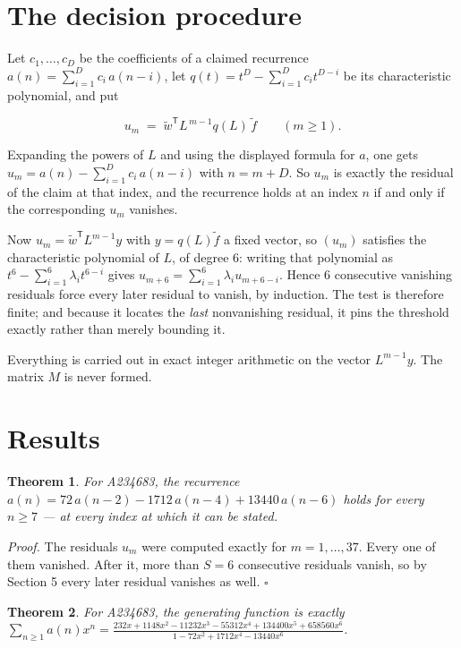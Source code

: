 \documentclass[11pt]{article}
\newtheorem{theorem}{Theorem}
\theoremstyle{definition}
\begin{document}
\section{The decision procedure}

Let $c_1,\dots,c_D$ be the coefficients of a claimed recurrence $a(n) = \sum_{i=1}^{D} c_i\,a(n-i)$, let $q(t) = t^{D} - \sum_{i=1}^{D} c_i t^{D-i}$ be its characteristic polynomial, and put

\[u_m \;=\; \tilde w^{\mathsf T} L^{\,m-1} q(L)\,\tilde f \qquad (m \ge 1).\]

Expanding the powers of $L$ and using the displayed formula for $a$, one gets $u_m = a(n) - \sum_{i=1}^{D} c_i\,a(n-i)$ with $n = m + D$. So $u_m$ is exactly the residual of the claim at that index, and the recurrence holds at an index $n$ if and only if the corresponding $u_m$ vanishes.

Now $u_m = \tilde w^{\mathsf T} L^{m-1} y$ with $y = q(L)\tilde f$ a fixed vector, so $(u_m)$ satisfies the characteristic polynomial of $L$, of degree $6$: writing that polynomial as $t^{6} - \sum_{i=1}^{6} \lambda_i t^{6-i}$ gives $u_{m+6} = \sum_{i=1}^{6} \lambda_i u_{m+6-i}$. Hence $6$ consecutive vanishing residuals force every later residual to vanish, by induction. The test is therefore finite; and because it locates the {\itshape last} nonvanishing residual, it pins the threshold exactly rather than merely bounding it.

Everything is carried out in exact integer arithmetic on the vector $L^{m-1}y$. The matrix $M$ is never formed.

\section{Results}

\begin{theorem} For A234683, the recurrence $a(n) = 72\,a(n-2) - 1712\,a(n-4) + 13440\,a(n-6)$ holds for every $n \ge 7$ --- at every index at which it can be stated.\end{theorem}

{\itshape Proof.} The residuals $u_m$ were computed exactly for $m = 1,\dots,37$. Every one of them vanished. After it, more than $S = 6$ consecutive residuals vanish, so by Section 5 every later residual vanishes as well. $\square$

\begin{theorem} For A234683, the generating function is exactly $\sum_{n\ge 1} a(n)x^n = \frac{232x + 1148x^{2} - 11232x^{3} - 55312x^{4} + 134400x^{5} + 658560x^{6}}{1 - 72x^{2} + 1712x^{4} - 13440x^{6}}$.\end{theorem}
\end{document}
